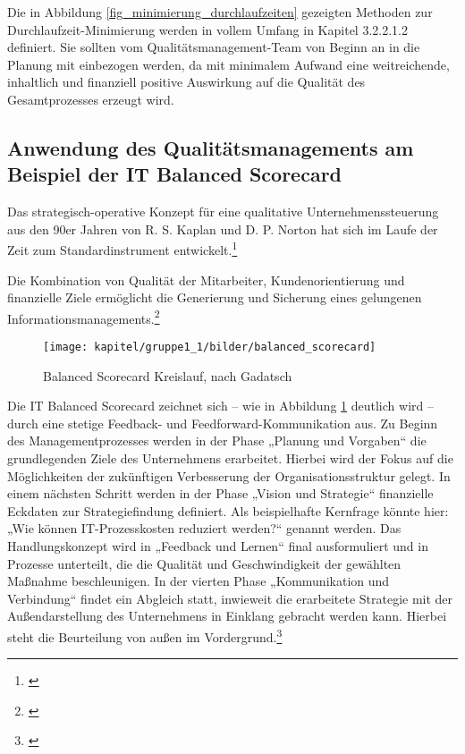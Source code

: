 Die in Abbildung \ref{fig_minimierung_durchlaufzeiten} gezeigten Methoden zur Durchlaufzeit-Minimierung werden in vollem Umfang in Kapitel 3.2.2.1.2 definiert. Sie sollten vom Qualitätsmanagement-Team von Beginn an in die Planung mit einbezogen werden, da mit minimalem Aufwand eine weitreichende, inhaltlich und finanziell positive Auswirkung auf die Qualität des Gesamtprozesses erzeugt wird. 

\subsection{Anwendung des Qualitätsmanagements am Beispiel der IT Balanced Scorecard}
Das strategisch-operative Konzept für eine qualitative Unternehmenssteuerung aus den 90er Jahren von R. S. Kaplan und D. P. Norton hat sich im Laufe der Zeit zum Standardinstrument entwickelt.\footnote{\cite{friedag_scorecard_2004}}

Die Kombination von Qualität der Mitarbeiter, Kundenorientierung und finanzielle Ziele ermöglicht die Generierung und Sicherung eines gelungenen Informationsmanagements.\footnote{\cite{gabriel_inm_2003}}

\begin{figure}[h!]
	\centering
	\texttt{[image: kapitel/gruppe1\_1/bilder/balanced\_scorecard]}
	\caption{Balanced Scorecard Kreislauf, nach Gadatsch}
	\label{fig_balanced_scorecard_cycle}
\end{figure}

Die IT Balanced Scorecard zeichnet sich – wie in Abbildung \ref{fig_balanced_scorecard_cycle} deutlich wird – durch eine stetige Feedback- und Feedforward-Kommunikation aus. Zu Beginn des Managementprozesses werden in der Phase „Planung und Vorgaben“ die grundlegenden Ziele des Unternehmens erarbeitet. Hierbei wird der Fokus auf die Möglichkeiten der zukünftigen Verbesserung der Organisationsstruktur gelegt. In einem nächsten Schritt werden in der Phase „Vision und Strategie“ finanzielle Eckdaten zur Strategiefindung definiert. Als beispielhafte Kernfrage könnte hier: „Wie können IT-Prozesskosten reduziert werden?“ genannt werden. Das Handlungskonzept wird in „Feedback und Lernen“ final ausformuliert und in Prozesse unterteilt, die die Qualität und Geschwindigkeit der gewählten Maßnahme beschleunigen. In der vierten Phase „Kommunikation und Verbindung“ findet ein Abgleich statt, inwieweit die erarbeitete Strategie mit der Außendarstellung des Unternehmens in Einklang gebracht werden kann. Hierbei steht die Beurteilung von außen im Vordergrund.\footnote{\cite{kaufmann_feinschliff_2002}}

